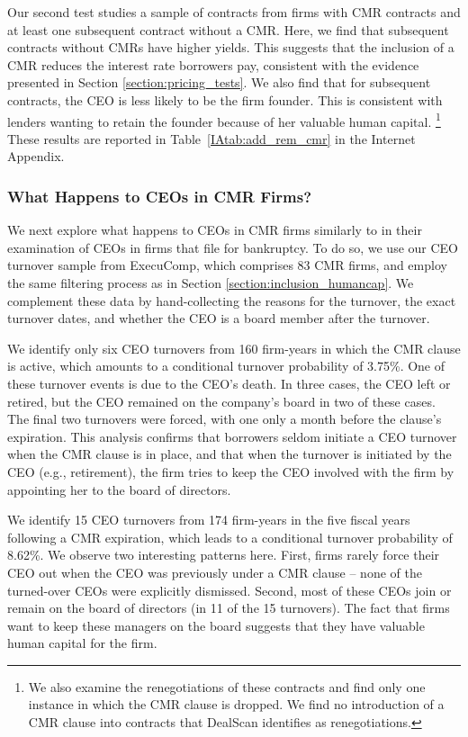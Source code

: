 \documentclass[a4paper,12pt]{article}
\begin{document}
Our second test studies a sample of contracts from firms with CMR contracts and at least one subsequent contract without a CMR.
Here, we find that subsequent contracts without CMRs have higher yields.
This suggests that the inclusion of a CMR reduces the interest rate borrowers pay, consistent with the evidence presented in Section \ref{section:pricing_tests}.
We also find that for subsequent contracts, the CEO is less likely to be the firm founder.
This is consistent with lenders wanting to retain the founder because of her valuable human capital.%
  \footnote{We also examine the renegotiations of these contracts and find only one instance in which the CMR clause is dropped. We find no introduction of a CMR clause into contracts that DealScan identifies as renegotiations.}
These results are reported in Table~\ref{IAtab:add_rem_cmr} in the Internet Appendix.


\subsubsection{What Happens to CEOs in CMR Firms?}

We next explore what happens to CEOs in CMR firms similarly to \citet{Eckbo_2016} in their examination of CEOs in firms that file for bankruptcy.
To do so, we use our CEO turnover sample from ExecuComp, which comprises 83 CMR firms, and employ the same filtering process as in Section \ref{section:inclusion_humancap}.
We complement these data by hand-collecting the reasons for the turnover, the exact turnover dates, and whether the CEO is a board member after the turnover.


We identify only six CEO turnovers from 160 firm-years in which the CMR clause is active, which amounts to a conditional turnover probability of 3.75\%.
One of these turnover events is due to the CEO's death.
In three cases, the CEO left or retired, but the CEO remained on the company's board in two of these cases.
The final two turnovers were forced, with one only a month before the clause's expiration.
This analysis confirms that borrowers seldom initiate a CEO turnover when the CMR clause is in place, and that when the turnover is initiated by the CEO (e.g., retirement), the firm tries to keep the CEO involved with the firm by appointing her to the board of directors.


We identify 15 CEO turnovers from 174 firm-years in the five fiscal years following a CMR expiration, which leads to a conditional turnover probability of 8.62\%.
We observe two interesting patterns here.
First, firms rarely force their CEO out when the CEO was previously under a CMR clause -- none of the turned-over CEOs were explicitly dismissed.
Second, most of these CEOs join or remain on the board of directors (in 11 of the 15 turnovers).
The fact that firms want to keep these managers on the board suggests that they have valuable human capital for the firm.
\end{document}
